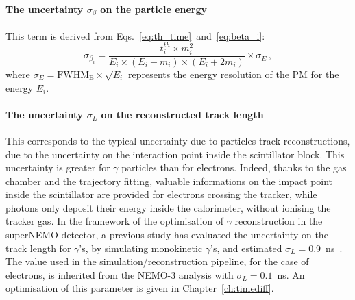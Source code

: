 \paragraph{The uncertainty $\sigma_{\beta}$ on the particle energy}
This term is derived from Eqs.~\eqref{eq:th_time}~and~\eqref{eq:beta_i}:
\begin{equation}
  \sigma_{\beta_{i}} = \frac{t^{th}_{i}\times m_{i}^{2}}{E_{i}\times (E_{i}+m_{i})\times (E_{i}+2m_{i})}\times \sigma_{E}\,,
  \label{eq:sigma_L}
\end{equation}
where $\sigma_{E}= \text{FWHM}_{\text{E}} \times \sqrt{E_{i}}$ represents the energy resolution of the PM for the energy $E_{i}$.

\paragraph{The uncertainty $\sigma_{L}$ on the reconstructed track length}
This corresponds to the typical uncertainty due to particles track reconstructions, due to the uncertainty on the interaction point inside the scintillator block.
This uncertainty is greater for $\gamma$ particles than for electrons.
Indeed, thanks to the gas chamber and the trajectory fitting, valuable informations on the impact point inside the scintillator are provided for electrons crossing the tracker, while photons only deposit their energy inside the calorimeter, without ionising the tracker gas.
In the framework of the optimisation of $\gamma$ reconstruction in the superNEMO detector, a previous study has evaluated the uncertainty on the track length for $\gamma$'s, by simulating monokinetic $\gamma$'s, and estimated $\sigma_{L}=0.9$~ns~\cite{CalvezThesis}.
The value used in the simulation/reconstruction pipeline, for the case of electrons, is inherited from the NEMO-$3$ analysis with $\sigma_{L}=0.1$~ns.
An optimisation of this parameter is given in Chapter~\ref{ch:timediff}.

\paragraph{}

